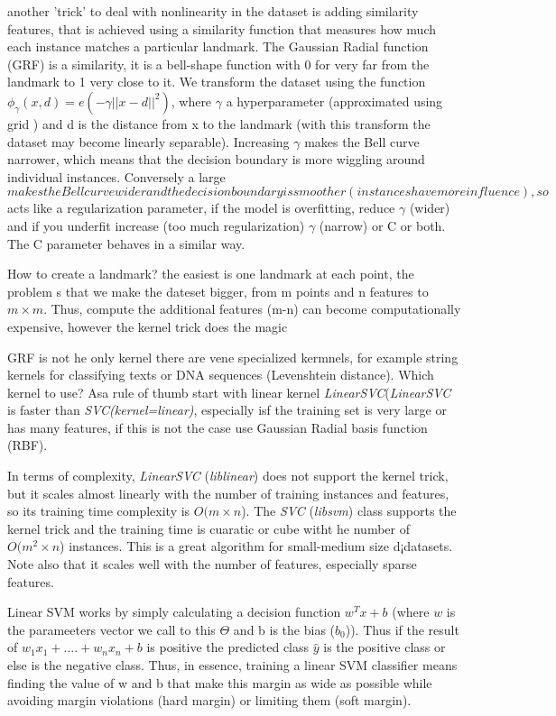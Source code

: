 \documentclass[12pt]{report}
\begin{document}
another 'trick' to deal with nonlinearity in the dataset is adding similarity features, that is achieved using a similarity function that measures how much each instance matches a particular landmark. The Gaussian Radial function (GRF) is a similarity, it is a bell-shape function with 0 for very far from the landmark to 1 very close to it. We transform the dataset using the function $\phi_{\gamma}(x,d) = e(-\gamma ||x-d||^2)$, where $\gamma$ a hyperparameter (approximated using grid ) and d is the distance from x to the landmark (with this transform the dataset may become linearly separable). Increasing $\gamma$ makes the Bell curve narrower, which means that the decision boundary is more wiggling around individual instances. Conversely a large $$ makes the Bell curve wider and the decision boundary is smoother (instances have more influence), so $$ acts like a regularization parameter, if the model is overfitting, reduce $\gamma$ (wider) and if you underfit increase (too much regularization) $\gamma$ (narrow) or C or both. The C parameter behaves in a similar way.

How to create a landmark? the easiest is one landmark at each point, the problem s that we make the dateset bigger, from m points and n features to $m \times m$. Thus, compute the additional features (m-n) can become computationally expensive, however the kernel trick does the magic 

GRF is not he only kernel there are vene specialized kermnels, for example  string kernels for classifying texts or DNA sequences (Levenshtein distance). Which kernel to use? Asa rule of thumb start with linear kernel \emph{LinearSVC}(\emph{LinearSVC} is faster than \emph{SVC(kernel=linear)}, especially isf the training set is very large or has many features, if this is not the case use Gaussian Radial basis function (RBF).

In terms of complexity, \emph{LinearSVC} (\emph{liblinear}) does not support the kernel trick, but it scales almost linearly with the number of training instances and features, so its training time complexity is $O(m \times n$).
The \emph{SVC} (\emph{libsvm}) class supports the kernel trick and the training time is cuaratic or cube witht he number of  $O(m^{2} \times n$) instances. This is a great algorithm for small-medium size d¡datasets. Note also that it scales well with the number of features, especially sparse features. 

Linear SVM works by simply calculating a decision function $w^Tx +b $ (where $w$ is the parameeters vector we call to this $\Theta$ and b is the bias ($b_0$)). Thus if the result of $w_{1} x_{1} + ....+ w_{n}x_{n} + b$ is positive the predicted class $\hat{y}$ is the positive class or else is the negative class. Thus, in essence, training a linear SVM classifier means finding the value of w and b that make this margin as wide as possible while avoiding margin violations (hard margin) or limiting them (soft margin).
\end{document}
